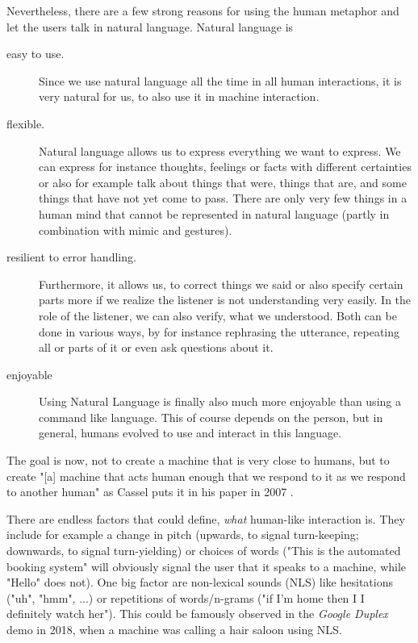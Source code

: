 \documentclass[
	11pt, %
]{fphw}
\begin{document}
Nevertheless, there are a few strong reasons for using the human metaphor and let the users talk in natural language. Natural language is
\begin{description}
    \item[easy to use.] Since we use natural language all the time in all human interactions, it is very natural for us, to also use it in machine interaction.
    \item[flexible.] Natural language allows us to express everything we want to express. We can express for instance thoughts, feelings or facts with different certainties or also for example talk about things that were, things that are, and some things that have not yet come to pass. There are only very few things in a human mind that cannot be represented in natural language (partly in combination with mimic and gestures).
    \item[resilient to error handling.] Furthermore, it allows us, to correct things we said or also specify certain parts more if we realize the listener is not understanding very easily. In the role of the listener, we can also verify, what we understood. Both can be done in various ways, by for instance rephrasing the utterance, repeating all or parts of it or even ask questions about it.
    \item[enjoyable] Using Natural Language is finally also much more enjoyable than using a command like language. This of course depends on the person, but in general, humans evolved to use and interact in this language.
\end{description}

The goal is now, not to create a machine that is very close to humans, but to create "[a] machine that acts human enough that we respond to it as we respond to another human" as Cassel puts it in his paper in 2007 \cite{cassel}.

There are endless factors that could define, \emph{what} human-like interaction is. They include for example a change in pitch (upwards, to signal turn-keeping; downwards, to signal turn-yielding) or choices of words ("This is the automated booking system" will obviously signal the user that it speaks to a machine, while "Hello" does not). One big factor are non-lexical sounds (NLS) like hesitations ("uh", "hmm", ...) or repetitions of words/n-grams ("if I'm home then I I definitely watch her"). This could be famously observed in the \emph{Google Duplex} demo in 2018, when a machine was calling a hair saloon using NLS.
\end{document}
